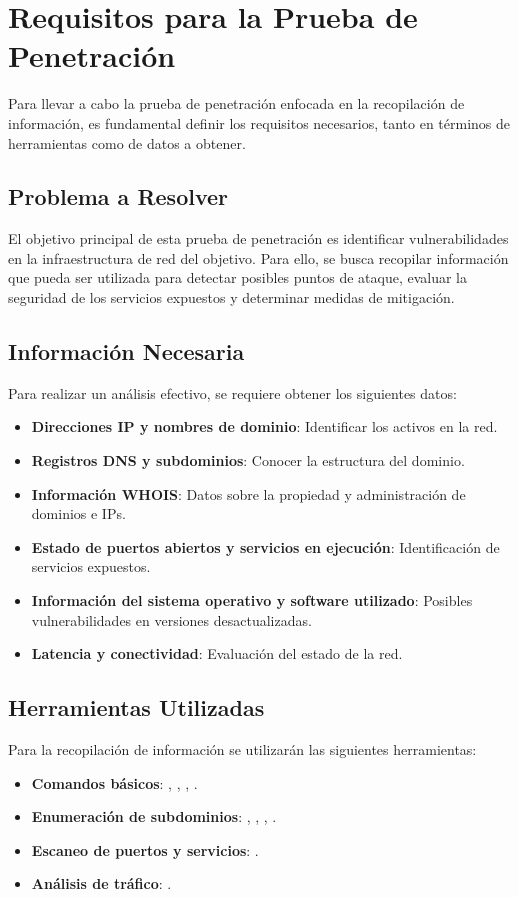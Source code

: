 \section{Requisitos para la Prueba de Penetración}

Para llevar a cabo la prueba de penetración enfocada en la recopilación de información, es fundamental definir los requisitos necesarios, tanto en términos de herramientas como de datos a obtener.

\subsection{Problema a Resolver}
El objetivo principal de esta prueba de penetración es identificar vulnerabilidades en la infraestructura de red del objetivo. Para ello, se busca recopilar información que pueda ser utilizada para detectar posibles puntos de ataque, evaluar la seguridad de los servicios expuestos y determinar medidas de mitigación.

\subsection{Información Necesaria}
Para realizar un análisis efectivo, se requiere obtener los siguientes datos:
\begin{itemize}
    \item \textbf{Direcciones IP y nombres de dominio}: Identificar los activos en la red.
    \item \textbf{Registros DNS y subdominios}: Conocer la estructura del dominio.
    \item \textbf{Información WHOIS}: Datos sobre la propiedad y administración de dominios e IPs.
    \item \textbf{Estado de puertos abiertos y servicios en ejecución}: Identificación de servicios expuestos.
    \item \textbf{Información del sistema operativo y software utilizado}: Posibles vulnerabilidades en versiones desactualizadas.
    \item \textbf{Latencia y conectividad}: Evaluación del estado de la red.
\end{itemize}

\subsection{Herramientas Utilizadas}
Para la recopilación de información se utilizarán las siguientes herramientas:
\begin{itemize}
    \item \textbf{Comandos básicos}: , , , .
    \item \textbf{Enumeración de subdominios}: , , , .
    \item \textbf{Escaneo de puertos y servicios}: .
    \item \textbf{Análisis de tráfico}: .
\end{itemize}

